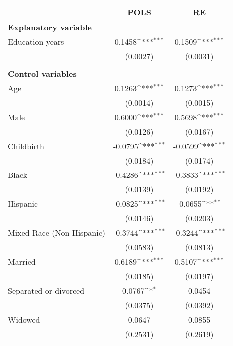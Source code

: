 {
\def\sym#1{\ifmmode^{#1}\else\(^{#1}\)\fi}
\begin{tabular}{l*{2}{c}}
\toprule
                    &\multicolumn{1}{c}{POLS}&\multicolumn{1}{c}{RE}\\
\midrule
\textbf{Explanatory variable}&                     &                     \\
Education years     &      0.1458\sym{***}&      0.1509\sym{***}\\
                    &    (0.0027)         &    (0.0031)         \\
\\ \textbf{Control variables}&                     &                     \\
Age                 &      0.1263\sym{***}&      0.1273\sym{***}\\
                    &    (0.0014)         &    (0.0015)         \\
Male                &      0.6000\sym{***}&      0.5698\sym{***}\\
                    &    (0.0126)         &    (0.0167)         \\
Childbirth          &     -0.0795\sym{***}&     -0.0599\sym{***}\\
                    &    (0.0184)         &    (0.0174)         \\
Black               &     -0.4286\sym{***}&     -0.3833\sym{***}\\
                    &    (0.0139)         &    (0.0192)         \\
Hispanic            &     -0.0825\sym{***}&     -0.0655\sym{**} \\
                    &    (0.0146)         &    (0.0203)         \\
Mixed Race (Non-Hispanic)&     -0.3744\sym{***}&     -0.3244\sym{***}\\
                    &    (0.0583)         &    (0.0813)         \\
Married             &      0.6189\sym{***}&      0.5107\sym{***}\\
                    &    (0.0185)         &    (0.0197)         \\
Separated or divorced&      0.0767\sym{*}  &      0.0454         \\
                    &    (0.0375)         &    (0.0392)         \\
Widowed             &      0.0647         &      0.0855         \\
                    &    (0.2531)         &    (0.2619)         \\

\end{tabular}}
